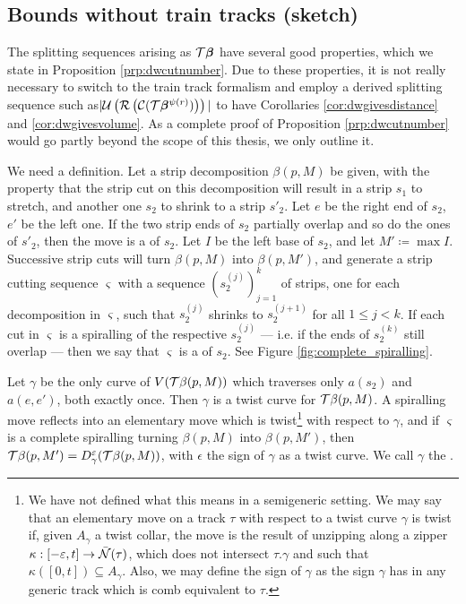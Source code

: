 \subsection{Bounds without train tracks (sketch)}

The splitting sequences arising as ${\mathcal T}\bm\beta$ have several good properties, which we state in Proposition \ref{prp:dwcutnumber}. Due to these properties, it is not really necessary to switch to the train track formalism and employ a derived splitting sequence such as\linebreak $|{\mathcal U}\left({\mathcal R}\left({\mathcal C}({\mathcal T}\bm\beta^{\psi(r)})\right)\right)|$ to have Corollaries \ref{cor:dwgivesdistance} and \ref{cor:dwgivesvolume}. As a complete proof of Proposition \ref{prp:dwcutnumber} would go partly beyond the scope of this thesis, we only outline it.

We need a definition. Let a strip decomposition $\beta(p,M)$ be given, with the property that the strip cut on this decomposition will result in a strip $s_1$ to stretch, and another one $s_2$ to shrink to a strip $s'_2$. Let $e$ be the right end of $s_2$, $e'$ be the left one. If the two strip ends of $s_2$ partially overlap and so do the ones of $s'_2$, then the move is a  of $s_2$. Let $I$ be the left base of $s_2$, and let $M'\coloneqq \max I$. Successive strip cuts will turn $\beta(p,M)$ into $\beta(p,M')$, and generate a strip cutting sequence $\bm\varsigma$ with a sequence $(s_2^{(j)})_{j=1}^k$ of strips, one for each decomposition in $\bm\varsigma$, such that $s_2^{(j)}$ shrinks to $s_2^{(j+1)}$ for all $1\leq j<k$. If each cut in $\bm\varsigma$ is a spiralling of the respective $s_2^{(j)}$ --- i.e. if the ends of $s_2^{(k)}$ still overlap --- then we say that $\bm\varsigma$ is a  of $s_2$. See Figure \ref{fig:complete_spiralling}.

Let $\gamma$ be the only curve of $V({\mathcal T}\beta(p,M))$ which traverses only $a(s_2)$ and $a(e,e')$, both exactly once. Then $\gamma$ is a twist curve for ${\mathcal T}\beta(p,M)$. A spiralling move reflects into an elementary move which is twist\footnote{We have not defined what this means in a semigeneric setting. We may say that an elementary move on a track $\tau$ with respect to a twist curve $\gamma$ is twist if, given $A_\gamma$ a twist collar, the move is the result of unzipping along a zipper $\kappa:[-\varepsilon, t]\rightarrow\bar{{\mathcal N}}(\tau)$, which does not intersect $\tau.\gamma$ and such that $\kappa([0,t])\subseteq A_\gamma$. Also, we may define the sign of $\gamma$ as the sign $\gamma$ has in any generic track which is comb equivalent to $\tau$.} with respect to $\gamma$, and if $\bm\varsigma$ is a complete spiralling turning $\beta(p,M)$ into $\beta(p,M')$, then ${\mathcal T}\beta(p,M')=D_\gamma^\varepsilon({\mathcal T}\beta(p,M))$, with $\epsilon$ the sign of $\gamma$ as a twist curve. We call $\gamma$ the .

